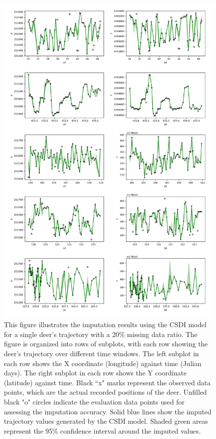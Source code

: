 \documentclass[11pt]{article}
\begin{document}
\begin{figure}[h]
  \centering
  \includegraphics[width=\textwidth]{../figure/20_5094_csdi} %
  \caption{This figure illustrates the imputation results using the CSDI model for a single deer's trajectory with a 20\% missing data ratio. The figure is organized into rows of subplots, with each row showing the deer's trajectory over different time windows. The left subplot in each row shows the X coordinate (longitude) against time (Julian days). The right subplot in each row shows the Y coordinate (latitude) against time. Black ``x" marks represent the observed data points, which are the actual recorded positions of the deer. Unfilled black "o" circles indicate the evaluation data points used for assessing the imputation accuracy. Solid blue lines show the imputed trajectory values generated by the CSDI model. Shaded green areas represent the 95\% confidence interval around the imputed values.}
  \label{fig: csdi_20} %
\end{figure}
\end{document}
